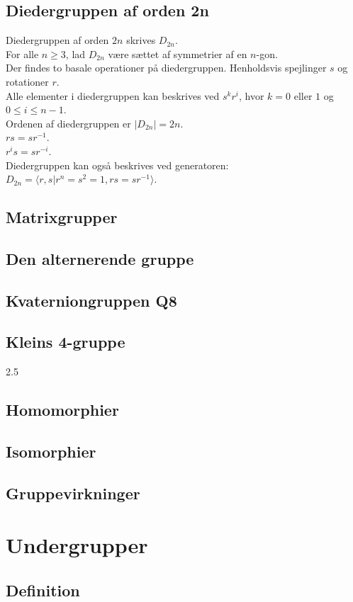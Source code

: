 \documentclass[11pt]{article}
\begin{document}
\subsection*{Diedergruppen af orden 2n}
Diedergruppen af orden $2n$ skrives $D_{2n}$.\\
For alle $n \geq 3$, lad $D_{2n}$ være sættet af symmetrier af en $n$-gon.\\
Der findes to basale operationer på diedergruppen. Henholdsvis spejlinger $s$ og rotationer $r$.\\
Alle elementer i diedergruppen kan beskrives ved $s^k r^i$, hvor $k = 0$ eller $1$ og $0 \leq i \leq n-1$.\\
Ordenen af diedergruppen er $|D_{2n}| = 2n$.\\
$r s = s r^{-1}$.\\
$r^i s = s r^{-i}$.\\
Diedergruppen kan også beskrives ved generatoren: $D_{2n} = \langle r, s | r^n = s^2 = 1, rs = s r^{-1} \rangle$.
\subsection*{Matrixgrupper}
\subsection*{Den alternerende gruppe}
\subsection*{Kvaterniongruppen Q8}
\subsection*{Kleins 4-gruppe}
2.5
\subsection*{Homomorphier}
\subsection*{Isomorphier}
\subsection*{Gruppevirkninger}


\section*{Undergrupper}
\subsection*{Definition}
\end{document}
